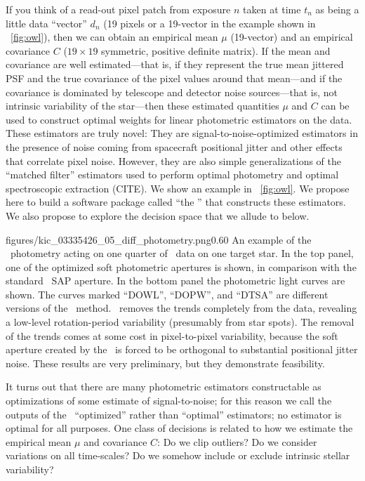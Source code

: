 \documentclass[letterpaper,12pt,preprint]{hack_aastex}
\begin{document}
If you think of a read-out pixel patch from exposure $n$ taken at time
$t_n$ as being a little data ``vector'' $d_n$ (19 pixels or a 19-vector
in the example shown in \figurename~\ref{fig:owl}), then we can obtain an
empirical mean $\mu$ (19-vector) and an empirical covariance $C$ ($19\times 19$
symmetric, positive definite matrix).
If the mean and covariance are well estimated---that is, if they
represent the true mean jittered PSF and the true covariance of the
pixel values around that mean---and if the covariance is dominated by
telescope and detector noise sources---that is, not intrinsic
variability of the star---then these estimated quantities $\mu$ and
$C$ can be used to construct optimal weights for linear photometric
estimators on the data.
These estimators are truly novel:
They are signal-to-noise-optimized estimators in the presence of noise coming
from spacecraft positional jitter and other effects that correlate pixel noise.
However, they are also simple generalizations of the ``matched filter''
estimators used to perform optimal photometry and optimal spectroscopic
extraction (CITE).
We show an example in \figurename~\ref{fig:owl}.
We propose here to build a software package called ``the \OWL'' that constructs
these estimators.
We also propose to explore the decision space that we allude to below.

%
            {figures/kic_03335426_05_diff_photometry.png}{0.60}{%
An example of the \OWL\ photometry acting on one quarter of \Kepler\ data
on one target star.
In the top panel, one of the optimized soft photometric apertures is shown,
in comparison with the standard \Kepler\ SAP aperture.
In the bottom panel the photometric light curves are shown.
The curves marked ``DOWL'', ``DOPW'', and ``DTSA'' are different versions of the
\OWL\ method.
\OWL\ removes the trends completely from the data,
revealing a low-level rotation-period variability (presumably from star spots).
The removal of the trends comes at some cost in pixel-to-pixel variability,
because the soft aperture created by the \OWL\ is forced to be orthogonal to
substantial positional jitter noise.
These results are very preliminary, but they demonstrate feasibility.
\label{fig:owl}}

It turns out that there are many photometric estimators constructable as
optimizations of some estimate of signal-to-noise; for this reason we call
the outputs of the \OWL\ ``optimized'' rather than ``optimal'' estimators;
no estimator is optimal for all purposes.
One class of decisions is related to how we estimate the empirical mean $\mu$
and covariance $C$:
Do we clip outliers?
Do we consider variations on all time-scales?
Do we somehow include or exclude intrinsic stellar variability?
\end{document}
